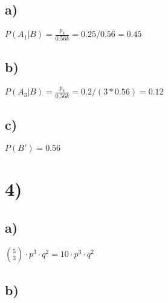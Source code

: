 \documentclass{article}
\begin{document}
    \subsection*{a)}
    \begin{math}
        P(A_1|B) = \frac{p_k}{0.56k} = 0.25/0.56 = 0.45
    \end{math}
    \subsection*{b)}
    \begin{math}
        P(A_3|B) = \frac{p_k}{0.56k} = 0.2/(3*0.56) = 0.12
    \end{math}
    \subsection*{c)}
    \(P(B') = 0.56\)
    \section*{4)}
    \subsection*{a)}
    \begin{math}
        {5 \choose 3} \cdot p^3 \cdot q^2 = 10\cdot p^3 \cdot q^2  
    \end{math}
    \subsection*{b)}
    

    
\end{document}
